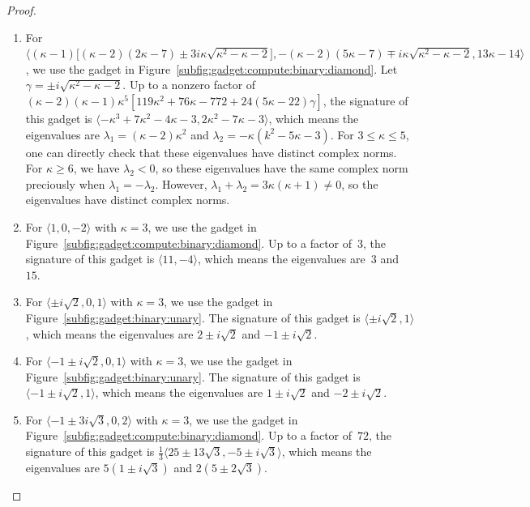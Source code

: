 \documentclass[11pt]{article}
\begin{document}
\begin{proof}
\begin{enumerate}
  \item
  For $\langle (\kappa - 1) \big[(\kappa - 2) (2 \kappa - 7) \pm 3 i \kappa \sqrt{\kappa^2 - \kappa - 2}\big], -(\kappa - 2) (5 \kappa - 7) \mp i \kappa \sqrt{\kappa^2 - \kappa - 2}, 13 \kappa - 14 \rangle$,
  we use the gadget in Figure~\ref{subfig:gadget:compute:binary:diamond}.
  Let $\gamma = \pm i \sqrt{\kappa^2 - \kappa - 2}$.
  Up to a nonzero factor of $(\kappa - 2) (\kappa - 1) \kappa^5 [119 \kappa^2 + 76 \kappa - 772 + 24 (5 \kappa - 22) \gamma]$,
  the signature of this gadget is $\langle -\kappa^3 + 7 \kappa^2 - 4 \kappa - 3, 2 \kappa^2 - 7 \kappa - 3 \rangle$,
  which means the eigenvalues are $\lambda_1 = (\kappa - 2) \kappa^2$ and $\lambda_2 = -\kappa (k^2 - 5 \kappa - 3)$.
  For $3 \le \kappa \le 5$,
  one can directly check that these eigenvalues have distinct complex norms.
  For $\kappa \ge 6$,
  we have $\lambda_2 < 0$,
  so these eigenvalues have the same complex norm preciously when $\lambda_1 = -\lambda_2$.
  However, $\lambda_1 + \lambda_2 = 3 \kappa (\kappa + 1) \ne 0$,
  so the eigenvalues have distinct complex norms.
  
  \item For $\langle 1,0,-2 \rangle$ with $\kappa = 3$,
  we use the gadget in Figure~\ref{subfig:gadget:compute:binary:diamond}.
  Up to a factor of~$3$,
  the signature of this gadget is $\langle 11,-4 \rangle$,
  which means the eigenvalues are~$3$ and~$15$.
  
  \item For $\langle \pm i \sqrt{2}, 0, 1 \rangle$ with $\kappa = 3$,
  we use the gadget in Figure~\ref{subfig:gadget:binary:unary}.
  The signature of this gadget is $\langle \pm i \sqrt{2}, 1 \rangle$,
  which means the eigenvalues are $2 \pm i \sqrt{2}$ and $-1 \pm i \sqrt{2}$.
  
  \item For $\langle -1 \pm i \sqrt{2}, 0, 1 \rangle$ with $\kappa = 3$,
  we use the gadget in Figure~\ref{subfig:gadget:binary:unary}.
  The signature of this gadget is $\langle -1 \pm i \sqrt{2}, 1 \rangle$,
  which means the eigenvalues are $1 \pm i \sqrt{2}$ and $-2 \pm i \sqrt{2}$.
  
  \item For $\langle -1 \pm 3 i \sqrt{3}, 0, 2 \rangle$ with $\kappa = 3$,
  we use the gadget in Figure~\ref{subfig:gadget:compute:binary:diamond}.
  Up to a factor of~$72$,
  the signature of this gadget is $\frac{1}{3} \langle 25 \pm 13 \sqrt{3}, -5 \pm i \sqrt{3} \rangle$,
  which means the eigenvalues are $5 (1 \pm i \sqrt{3})$ and $2 (5 \pm 2 \sqrt{3})$.
  \qedhere
 \end{enumerate}
\end{proof}
\end{document}
